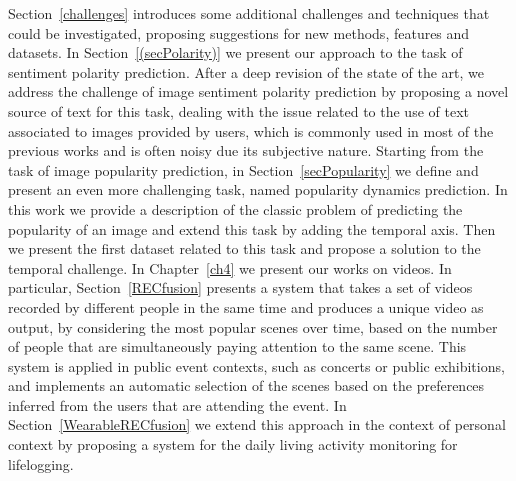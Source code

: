 Section~\ref{challenges} introduces some additional challenges and techniques that could be investigated, proposing suggestions for new methods, features and datasets.
In Section~\ref{(secPolarity)} we present our approach to the task of sentiment polarity prediction. After a deep revision of the state of the art, we address the challenge of image sentiment polarity prediction by proposing a novel source of text for this task, dealing with the issue related to the use of text associated to images provided by users, which is commonly used in most of the previous works and is often noisy due its subjective nature.
Starting from the task of image popularity prediction, in Section~\ref{secPopularity} we define and present an even more challenging task, named popularity dynamics prediction. In this work we provide a description of the classic problem of predicting the popularity of an image and extend this task by adding the temporal axis. 
Then we present the first dataset related to this task and propose a solution to the temporal challenge.
In Chapter~\ref{ch4} we present our works on videos. In particular, Section~\ref{RECfusion} presents a system that takes a set of videos recorded by different people in the same time and produces a unique video as output, by considering the most popular scenes over time, based on the number of people that are simultaneously paying attention to the same scene. This system is applied in public event contexts, such as concerts or public exhibitions, and implements an automatic selection of the scenes based on the preferences inferred from the users that are attending the event.
In Section~\ref{WearableRECfusion} we extend this approach in the context of personal context by proposing a system for the daily living activity monitoring for lifelogging.


